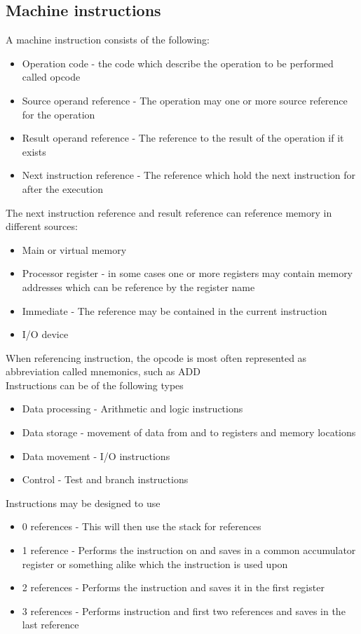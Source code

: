 \documentclass[12pt, a4paper]{article}
\begin{document}
		\subsection{Machine instructions}
			A machine instruction consists of the following:
			\begin{itemize}
				\item Operation code - the code which describe the operation to be performed called opcode
				\item Source operand reference - The operation may one or more source reference for the operation
				\item Result operand reference - The reference to the result of the operation if it exists
				\item Next instruction reference - The reference which hold the next instruction for after the execution
			\end{itemize}
			The next instruction reference and result reference can reference memory in different sources:
			\begin{itemize}
				\item Main or virtual memory
				\item Processor register - in some cases one or more registers may contain memory addresses which can be reference by the register name
				\item Immediate - The reference may be contained in the current instruction
				\item I/O device 
			\end{itemize}
			When referencing instruction, the opcode is most often represented as abbreviation called mnemonics, such as ADD\\
			Instructions can be of the following types
			\begin{itemize}
				\item Data processing - Arithmetic and logic instructions
				\item Data storage - movement of data from and to registers and memory locations
				\item Data movement - I/O instructions
				\item Control - Test and branch instructions
			\end{itemize}
			Instructions may be designed to use 
			\begin{itemize}
				\item 0 references - This will then use the stack for references
				\item 1 reference - Performs the instruction on and saves in a common accumulator register or something alike which the instruction is used upon 
				\item 2 references - Performs the instruction and saves it in the first register
				\item 3 references - Performs instruction and first two references and saves in the last reference
			\end{itemize}
\end{document}
